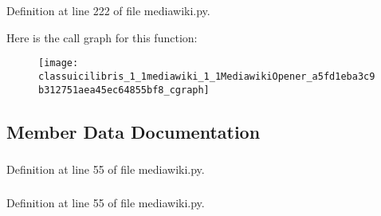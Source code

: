 \-Definition at line 222 of file mediawiki.\-py.



\-Here is the call graph for this function\-:
\nopagebreak
\begin{figure}[H]
\begin{center}
\leavevmode
\texttt{[image: classuicilibris\_1\_1mediawiki\_1\_1MediawikiOpener\_a5fd1eba3c9b312751aea45ec64855bf8\_cgraph]}
\end{center}
\end{figure}




\subsection{\-Member \-Data \-Documentation}
\hypertarget{classuicilibris_1_1mediawiki_1_1MediawikiOpener_aca3ae7582d52993d0acd3fd78e887d2e}{
\subsubsection[{base\-Url}]{}}\label{classuicilibris_1_1mediawiki_1_1MediawikiOpener_aca3ae7582d52993d0acd3fd78e887d2e}


\-Definition at line 55 of file mediawiki.\-py.

\hypertarget{classuicilibris_1_1mediawiki_1_1MediawikiOpener_ab452cfcb0733d955a38d6f4279788527}{
\subsubsection[{host}]{}}\label{classuicilibris_1_1mediawiki_1_1MediawikiOpener_ab452cfcb0733d955a38d6f4279788527}


\-Definition at line 55 of file mediawiki.\-py.

\hypertarget{classuicilibris_1_1mediawiki_1_1MediawikiOpener_a6f7e48cd8ca22fb1e51fd920c3da6609}{
\subsubsection[{logged}]{}}\label{classuicilibris_1_1mediawiki_1_1MediawikiOpener_a6f7e48cd8ca22fb1e51fd920c3da6609}


